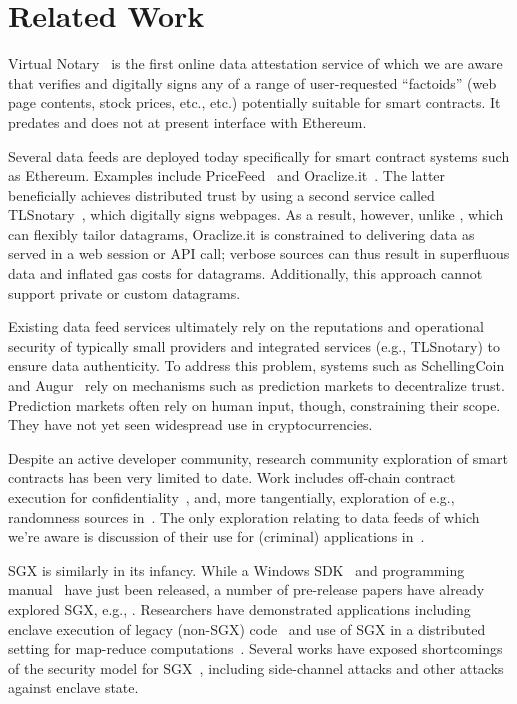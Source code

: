 \section{Related Work}
\label{sec:related}

Virtual Notary~\cite{VN:2013,VN2016} is the first online data attestation service of which we are aware that verifies and digitally signs any of a range of user-requested ``factoids'' (web page contents, stock prices, etc., etc.) potentially suitable for smart contracts. It predates and does not at present interface with Ethereum.

Several data feeds are deployed today specifically for smart contract systems such as Ethereum. Examples include PriceFeed~\cite{PriceFeed:2016} and Oraclize.it~\cite{Oraclize:2016}. The latter beneficially achieves distributed trust by using a second service called TLSnotary~\cite{TLSnotary}, which digitally signs webpages. As a result, however, unlike \tc, which can flexibly tailor datagrams, Oraclize.it is constrained to delivering data as served in a web session or API call; verbose sources can thus result in superfluous data and inflated gas costs for datagrams. Additionally, this approach cannot support private or custom datagrams. 

Existing data feed services ultimately rely on the reputations and operational security of typically small providers and integrated services (e.g., TLSnotary) to ensure data authenticity. 
To address this problem, systems such as SchellingCoin~\cite{schellingcoin} and Augur~\cite{augur} rely on mechanisms such as prediction markets to decentralize trust. Prediction markets often rely on human input, though, constraining their scope. They have not yet seen widespread use in cryptocurrencies. 

Despite an active developer community, research community exploration of smart contracts has been very limited to date. Work includes off-chain contract execution for confidentiality~\cite{hawk}, and, more tangentially, exploration of e.g., randomness sources in~\cite{bonneau2015bitcoin}. The only exploration relating to data feeds of which we're aware is discussion of their use for (criminal) applications in~\cite{gyges}.

SGX is similarly in its infancy.
While a Windows SDK~\cite{sgxsdk} and programming manual~\cite{sgxmanual} have just been released, a number of pre-release papers have already explored SGX, e.g., \cite{VC3,7163052,anati2013innovative,McKeen:2013jv,Phegade:2013km}. Researchers have demonstrated applications including enclave execution of legacy (non-SGX) code~\cite{haven} and use of SGX in a distributed setting for map-reduce computations~\cite{VC3}. Several works have exposed shortcomings of the security model for SGX~\cite{sgxexplained,sgxsok,shihardwaretalk}, including side-channel attacks and other attacks against enclave state. 


